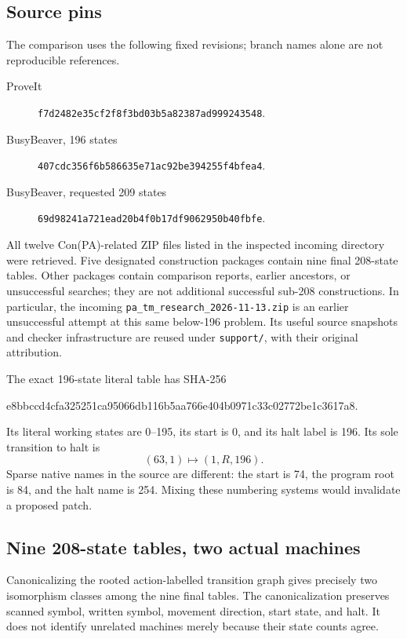 \documentclass[11pt,a4paper]{article}
\newcommand{\code}[1]{\nolinkurl{#1}}
\begin{document}
\subsection{Source pins}

The comparison uses the following fixed revisions; branch names alone are not reproducible references.
\begin{description}
\item[ProveIt] \code{f7d2482e35cf2f8f3bd03b5a82387ad999243548}.
\item[BusyBeaver, 196 states] \code{407cdc356f6b586635e71ac92be394255f4bfea4}.
\item[BusyBeaver, requested 209 states] \code{69d98241a721ead20b4f0b17df9062950b40fbfe}.
\end{description}

All twelve Con(PA)-related ZIP files listed in the inspected incoming directory were retrieved. Five designated construction packages contain nine final 208-state tables. Other packages contain comparison reports, earlier ancestors, or unsuccessful searches; they are not additional successful sub-208 constructions. In particular, the incoming \code{pa_tm_research_2026-11-13.zip} is an earlier unsuccessful attempt at this same below-196 problem. Its useful source snapshots and checker infrastructure are reused under \code{support/}, with their original attribution.

The exact 196-state literal table has SHA-256
\begin{center}\small\ttfamily
 e8bbccd4cfa325251ca95066db116b5aa766e404b0971c33c02772be1c3617a8.
\end{center}
Its literal working states are 0--195, its start is 0, and its halt label is 196. Its sole transition to halt is
\[
(63,1)\longmapsto(1,R,196).
\]
Sparse native names in the source are different: the start is 74, the program root is 84, and the halt name is 254. Mixing these numbering systems would invalidate a proposed patch.

\subsection{Nine 208-state tables, two actual machines}

Canonicalizing the rooted action-labelled transition graph gives precisely two isomorphism classes among the nine final tables. The canonicalization preserves scanned symbol, written symbol, movement direction, start state, and halt. It does not identify unrelated machines merely because their state counts agree.
\end{document}
